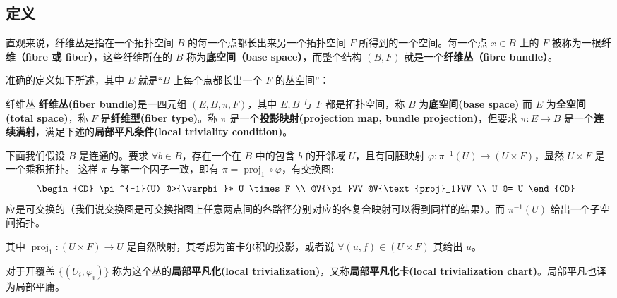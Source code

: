 
\begin{issues}
\issueDraft
\end{issues}


\subsection{定义}

直观来说，纤维丛是指在一个拓扑空间 $B$ 的每一个点都长出来另一个拓扑空间 $F$ 所得到的一个空间。每一个点 $x\in B$ 上的 $F$ 被称为一根\textbf{纤维（fibre 或 fiber）}，这些纤维所在的 $B$ 称为\textbf{底空间（base space）}，而整个结构 $(B, F)$ 就是一个\textbf{纤维丛（fibre bundle）}。

准确的定义如下所述，其中 $E$ 就是“$B$ 上每个点都长出一个 $F$ 的丛空间”：
\begin{definition}{纤维丛}
	\textbf{纤维丛(fiber bundle)}是一四元组 $(E, B, \pi, F)$，其中 $E, B$ 与 $F$ 都是拓扑空间，称 $B$ 为\textbf{底空间(base space)} 而 $E$ 为\textbf{全空间(total space)}，称 $F$ 是\textbf{纤维型(fiber type)}。称 $\pi$ 是一个\textbf{投影映射(projection map, bundle projection)}，但要求 $\pi: E\rightarrow B$ 是一个\textbf{连续满射}，满足下述的\textbf{局部平凡条件(local triviality condition)}。

	下面我们假设 $B$ 是连通的。要求 $\forall b \in B$，存在一个在 $B$ 中的包含 $b$ 的开邻域 $U$，且有同胚映射 $\varphi: \pi^{-1}(U) \rightarrow (U \times F)$，显然 $U \times F$ 是一个乘积拓扑。
	这样 $\pi$ 与第一个因子一致，即有 $\pi = \operatorname{proj}_1 \circ \varphi$，有交换图:
\begin{equation}
	\begin{CD}
		\pi^{-1}(U) @>{\varphi}>> U \times F \\
		@V{\pi}VV @V{\text{proj}_1}VV \\
		U @= U
	\end{CD}~~
\end{equation}
应是可交换的（我们说交换图是可交换指图上任意两点间的各路径分别对应的各复合映射可以得到同样的结果）。而 $\pi^{-1}(U)$ 给出一个子空间拓扑。

其中 $\operatorname{proj}_1 : (U \times F) \rightarrow U$ 是自然映射，其考虑为笛卡尔积的投影，或者说 $\forall (u, f) \in (U \times F)$ 其给出 $u$。

对于开覆盖 $\{(U_i, \varphi_i)\}$ 称为这个丛的\textbf{局部平凡化(local trivialization)}，又称\textbf{局部平凡化卡(local trivialization chart)}。局部平凡也译为局部平庸。

\end{definition}

